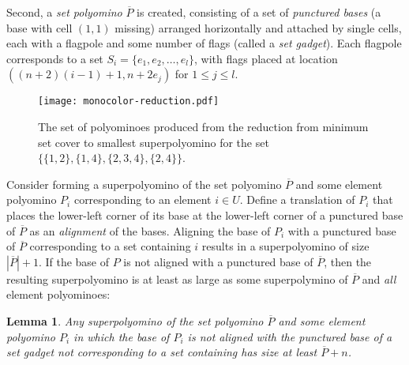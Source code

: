 \documentclass{article}
\newtheorem{lemma}[theorem]{Lemma}
\begin{document}
Second, a \emph{set polyomino} $\overline{P}$ is created, consisting of a set of \emph{punctured bases} (a base with cell $(1, 1)$ missing) arranged horizontally and attached by single cells, each with a flagpole and some number of flags (called a \emph{set gadget}).
Each flagpole corresponds to a set $S_i = \{e_1, e_2, \dots, e_l\}$, with flags placed at location $((n+2)(i-1) + 1, n + 2e_j)$ for $1 \leq j \leq l$.

\begin{figure}[ht]
\centering
\texttt{[image: monocolor-reduction.pdf]}
\caption{The set of polyominoes produced from the reduction from minimum set cover to smallest superpolyomino for the set $\{\{1, 2\}, \{1, 4\}, \{2, 3, 4\}, \{2, 4\}\}$.}
\label{fig:monocolor-reduction}
\end{figure}

Consider forming a superpolyomino of the set polyomino $\overline{P}$ and some element polyomino $P_i$ corresponding to an element $i \in U$.
Define a translation of $P_i$ that places the lower-left corner of its base at the lower-left corner of a punctured base of $\overline{P}$ as an \emph{alignment} of the bases.
Aligning the base of $P_i$ with a punctured base of $\overline{P}$ corresponding to a set containing $i$ results in a superpolyomino of size $|\overline{P}|+1$.
If the base of $P$ is not aligned with a punctured base of $\overline{P}$, then the resulting superpolyomino is at least as large as some superpolymino of $\overline{P}$ and \emph{all} element polyominoes:

\begin{lemma}
\label{lem:no-align-has-big-cost}
Any superpolyomino of the set polyomino $\overline{P}$ and some element polyomino $P_i$ in which the base of $P_i$ is not aligned with the punctured base of a set gadget not corresponding to a set containing has size at least $\overline{P} + n$. 
\end{lemma}
\end{document}
